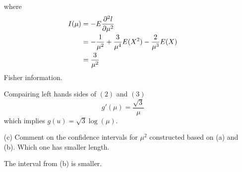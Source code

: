 \documentclass{tufte-book}
\begin{document}
\begin{enumerate}
where
\begin{align*}
I(\mu) &= -E\frac{\partial ^2l}{\partial \mu^2}\\
&= -\frac{1}{\mu^2} + \frac{3}{\mu^4}E(X^2) - \frac{2}{\mu^3}E(X)\\
&= \frac{3}{\mu^2}
\end{align*}
Fisher information.

Compairing left hands sides of $(2)$ and $(3)$
\[ g'(\mu) = \frac{\sqrt{3}}{\mu} \]
which implies $g(u) = \sqrt{3}\log(\mu)$.

\item[(c)] Comment on the confidence intervals for $\mu^2$ constructed based on (a) and (b).  Which one has smaller length.

The interval from (b) is smaller. 

\end{enumerate}
\end{document}

